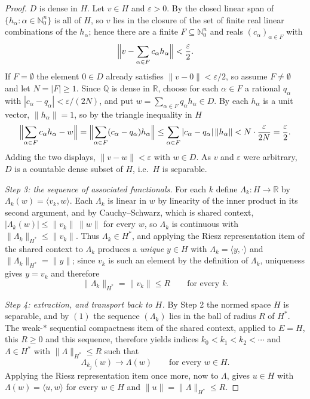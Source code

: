 \begin{proof}
$D$ is dense in $H$.  Let $v \in H$ and $\varepsilon > 0$.  By
 the closed linear span of
$\{h_\alpha : \alpha \in \mathbb{N}_0^n\}$ is all of $H$, so $v$ lies in the
closure of the set of finite real linear combinations of the $h_\alpha$; hence
there are a finite $F \subseteq \mathbb{N}_0^n$ and reals $(c_\alpha)_{\alpha\in F}$
with
\[
  \Bigl\| v - \sum_{\alpha \in F} c_\alpha h_\alpha \Bigr\| < \frac{\varepsilon}{2}.
\]
If $F = \emptyset$ the element $0 \in D$ already satisfies
$\|v - 0\| < \varepsilon/2$, so assume $F \neq \emptyset$ and let $N = |F| \geq 1$.
Since $\mathbb{Q}$ is dense in $\mathbb{R}$, choose for each $\alpha \in F$ a
rational $q_\alpha$ with $|c_\alpha - q_\alpha| < \varepsilon/(2N)$, and put
$w = \sum_{\alpha\in F} q_\alpha h_\alpha \in D$.  By
 each $h_\alpha$ is a unit vector,
$\|h_\alpha\| = 1$, so by the triangle inequality in $H$
\[
  \Bigl\| \sum_{\alpha\in F} c_\alpha h_\alpha - w \Bigr\|
    = \Bigl\| \sum_{\alpha\in F} (c_\alpha - q_\alpha) h_\alpha \Bigr\|
    \leq \sum_{\alpha\in F} |c_\alpha - q_\alpha|\,\|h_\alpha\|
    < N \cdot \frac{\varepsilon}{2N} = \frac{\varepsilon}{2}.
\]
Adding the two displays, $\|v - w\| < \varepsilon$ with $w \in D$.  As $v$ and
$\varepsilon$ were arbitrary, $D$ is a countable dense subset of $H$, i.e.\ $H$
is separable.

\emph{Step 3: the sequence of associated functionals.}
For each $k$ define $\Lambda_k : H \to \mathbb{R}$ by
$\Lambda_k(w) = \langle v_k, w\rangle$.  Each $\Lambda_k$ is linear in $w$ by
linearity of the inner product in its second argument, and by Cauchy--Schwarz,
which is shared context, $|\Lambda_k(w)| \leq \|v_k\|\,\|w\|$ for every $w$, so
$\Lambda_k$ is continuous with $\|\Lambda_k\|_{H^*} \leq \|v_k\|$.  Thus
$\Lambda_k \in H^*$, and applying the Riesz representation item of the shared
context to $\Lambda_k$ produces a \emph{unique} $y \in H$ with
$\Lambda_k = \langle y, \cdot\rangle$ and $\|\Lambda_k\|_{H^*} = \|y\|$; since
$v_k$ is such an element by the definition of $\Lambda_k$, uniqueness gives
$y = v_k$ and therefore
\begin{equation*}
  \|\Lambda_k\|_{H^*} = \|v_k\| \leq R \qquad\text{for every } k. \tag{1}
\end{equation*}

\emph{Step 4: extraction, and transport back to $H$.}
By Step 2 the normed space $H$ is separable, and by $(1)$ the sequence
$(\Lambda_k)$ lies in the ball of radius $R$ of $H^*$.  The weak-$*$ sequential
compactness item of the shared context, applied to $E = H$, this $R \geq 0$ and
this sequence, therefore yields indices $k_0 < k_1 < k_2 < \cdots$ and
$\Lambda \in H^*$ with $\|\Lambda\|_{H^*} \leq R$ such that
\begin{equation*}
  \Lambda_{k_j}(w) \longrightarrow \Lambda(w)
  \qquad\text{for every } w \in H. \tag{2}
\end{equation*}
Applying the Riesz representation item once more, now to $\Lambda$, gives
$u \in H$ with $\Lambda(w) = \langle u, w\rangle$ for every $w \in H$ and
$\|u\| = \|\Lambda\|_{H^*} \leq R$.


\end{proof}
